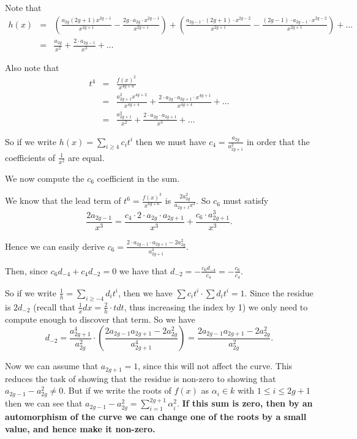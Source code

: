 \documentclass[draft, 11pt]{article} %
\theoremstyle{plain}
\theoremstyle{remark}
\begin{document}
Note that 
\begin{eqnarray}
h(x) & = & \left( \frac{a_{2g}(2g+1)x^{2g-1}}{x^{2g+1}} - \frac{2g\cdot a_{2g}\cdot x^{2g-1}}{x^{2g+1}} \right) + \left(\frac{a_{2g-1}\cdot(2g+1)\cdot x^{2g-2}}{x^{2g+1}} - \frac{(2g-1)\cdot a_{2g-1} \cdot x^{2g-2}}{x^{2g+1}} \right) + \ldots \\
& = & \frac{a_{2g}}{x^2} + \frac{2\cdot a_{2g-1}}{x^3} + \ldots
\end{eqnarray}

Also note that 
\begin{eqnarray}
t^4 & = & \frac{f(x)^2}{x^{4g+4}} \\
& = & \frac{a_{2g+1}^2 x^{4g+2}}{x^{4g+4}} + \frac{2\cdot a_{2g}\cdot a_{2g+1} \cdot x^{4g+1}}{x^{4g+4}} + \ldots \\
& = & \frac{a_{2g+1}^2}{x^2} + \frac{2\cdot a_{2g} \cdot a_{2g+1}}{x^3} + \ldots
\end{eqnarray}

So if we write $h(x) = \sum_{i\geq 4} c_i t^i$ then we must have $c_4 = \frac{a_{2g}}{a_{2g+1}^2}$ in order that the coefficients of $\frac{1}{x^2}$ are equal.

We now compute the $c_6$ coefficient in the sum.

We know that the lead term of $t^6 = \frac{f(x)^3}{x^{6g+6}}$ is $\frac{2a_{2g}^2}{a_{2g+1}x^3}$.
So $c_6$ must satisfy
\[
\frac{2a_{2g-1}}{x^3} = \frac{c_4\cdot 2 \cdot a_{2g} \cdot a_{2g+1}}{x^3} + \frac{c_6 \cdot a_{2g+1}^3}{x^3}.
\]

Hence we can easily derive $c_6 = \frac{2\cdot a_{2g-1} \cdot a_{2g+1} - 2a_{2g}^2}{a_{2g+1}^4}$.

Then, since $c_6d_{-4} + c_4d_{-2} = 0$ we have that $d_{-2} = -\frac{c_6d_{-4}}{c_4} = -\frac{c_6}{c_4}$.

So if we write $\frac{1}{h}  = \sum_{i\geq -4} d_it^i$, then we have $\sum c_it^i \cdot \sum d_it^i = 1$.
Since the residue is $2d_{-2}$ (recall that $\frac{1}{x}dx = \frac{2}{h}\cdot t dt$, thus increasing the index by 1) we only need to compute enough to discover that term.
So  we have 
\[
d_{-2} = \frac{a_{2g+1}^4}{a_{2g}^2} \cdot \left( \frac{2a_{2g-1}a_{2g+1} - 2a_{2g}^2}{a_{2g+1}^4} \right) = \frac{2a_{2g-1}a_{2g+1} - 2a_{2g}^2}{a_{2g}^2}.
\]

Now we can assume that $a_{2g+1} = 1$, since this will not affect the curve.
This reduces the task of showing that the residue is non-zero to showing that $a_{2g-1} -a_{2g}^2 \neq 0$.
But if we write the roots of $f(x)$ as $\alpha_i \in k$ with $1\leq i \leq 2g+1$ then we can see that $a_{2g-1} -a_{2g}^2 = \sum_{i=1}^{2g+1}\alpha_i^2$.
{\bf If this sum is zero, then by an automorphism of the curve we can change one of the roots by a small value, and hence make it non-zero.}
\end{document}
